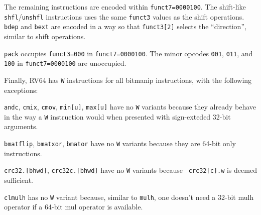 The remaining instructions are encoded within {\tt funct7=0000100}. The
shift-like {\tt shfl}/{\tt unshfl} instructions uses the same {\tt funct3}
values as the shift operations. {\tt bdep} and {\tt bext} are encoded in a
way so that {\tt funct3[2]} selects the ``direction'', similar to shift
operations.

{\tt pack} occupies {\tt funct3=000} in {\tt funct7=0000100}. The minor
opcodes {\tt 001}, {\tt 011}, and {\tt 100} in {\tt funct7=0000100}
are unoccupied.

Finally, RV64 has {\tt *W} instructions for all bitmanip instructions, with the
following exceptions:

{\tt andc}, {\tt cmix}, {\tt cmov}, {\tt min[u]}, {\tt max[u]} have no {\tt *W}
variants because they already behave in the way a {\tt *W} instruction would
when presented with sign-exteded 32-bit arguments.

{\tt bmatflip}, {\tt bmatxor}, {\tt bmator} have no {\tt *W} variants because
they are 64-bit only instructions.

{\tt crc32.[bhwd]}, {\tt crc32c.[bhwd]} have no {\tt *W} variants because {\tt
crc32[c].w} is deemed sufficient.

{\tt clmulh} has no {\tt *W} variant because, similar to {\tt mulh}, one
doesn't need a 32-bit mulh operator if a 64-bit mul operator is available.


